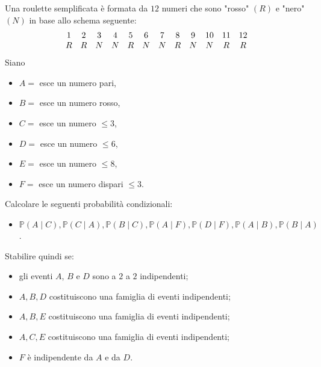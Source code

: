 Una roulette semplificata è formata da $12$ numeri che sono "rosso" $( R)$ e "nero" $( N)$ in base allo schema seguente:
\begin{equation*}
\begin{array}{ c c c c c c c c c c c c }
1 & 2 & 3 & 4 & 5 & 6 & 7 & 8 & 9 & 10 & 11 & 12\\
R & R & N & N & R & N & N & R & N & N & R & R
\end{array}
\end{equation*}
Siano
\begin{itemize}
\item $A=$ esce un numero pari,
\item $B=$ esce un numero rosso,
\item $C=$ esce un numero $\leq 3$,
\item $D=$ esce un numero $\leq 6$,
\item $E=$ esce un numero $\leq 8$,
\item $F=$ esce un numero dispari $\leq 3$.
\end{itemize}

Calcolare le seguenti probabilità condizionali:
\begin{itemize}
\item $\mathbb{P}( A\mid C) ,\mathbb{P}( C\mid A) ,\mathbb{P}( B\mid C) ,\mathbb{P}( A\mid F) ,\mathbb{P}( D\mid F) ,\mathbb{P}( A\mid B) ,\mathbb{P}( B\mid A)$.
\end{itemize}

Stabilire quindi se:
\begin{itemize}
\item gli eventi $A$, $B$ e $D$ sono a $2$ a $2$ indipendenti;
\item $A,B,D$ costituiscono una famiglia di eventi indipendenti;
\item $A,B,E$ costituiscono una famiglia di eventi indipendenti;
\item $A,C,E$ costituiscono una famiglia di eventi indipendenti;
\item $F$ è indipendente da $A$ e da $D$.
\end{itemize}
\Esercizio{}


